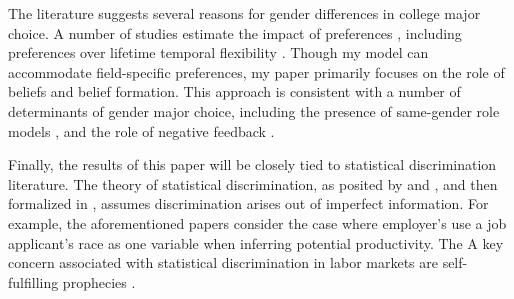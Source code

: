 
The literature suggests several reasons for gender differences in college major choice.
A number of studies estimate the impact of preferences \parencite{Z13,WZ14}, including preferences over lifetime temporal flexibility \parencite{B15,WZ18}.
Though my model can accommodate field-specific preferences, my paper primarily focuses on the role of beliefs and belief formation.
This approach is consistent with a number of determinants of gender major choice, including the presence of same-gender role models \parencite{PS20,LM20}, and the role of negative feedback \parencite{KTU17}.




Finally, the results of this paper will be closely tied to statistical discrimination literature. 
The theory of statistical discrimination, as posited by \textcite{A72} and \textcite{P72}, and then formalized in \textcite{AC77}, assumes discrimination arises out of imperfect information.
For example, the aforementioned papers consider the case where employer's use a job applicant's race as one variable when inferring potential productivity.
The 
A key concern associated with statistical discrimination in labor markets are self-fulfilling prophecies \parencite{LS83,CL93}. 

